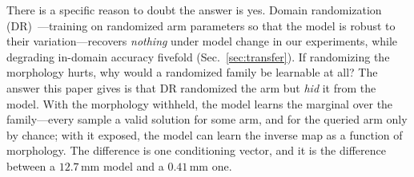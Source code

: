 \documentclass[robotics,article,submit,moreauthors]{Definitions/mdpi}
\begin{document}
There is a specific reason to doubt the answer is yes. Domain randomization
(DR)~\cite{tobin2017domain}---training on randomized arm parameters so that
the model is robust to their variation---recovers \emph{nothing} under
model change in our experiments, while degrading in-domain accuracy
fivefold (Sec.~\ref{sec:transfer}). If randomizing the
morphology hurts, why would a randomized family be learnable at all? The
answer this paper gives is that DR randomized the arm but \emph{hid} it
from the model. With the morphology withheld, the model learns the
marginal over the family---every sample a valid solution for some arm, and
for the queried arm only by chance; with it exposed, the model can learn
the inverse map as a function of morphology. The difference is one conditioning vector,
and it is the difference between a $12.7\,$mm model and a $0.41\,$mm one.
\end{document}
